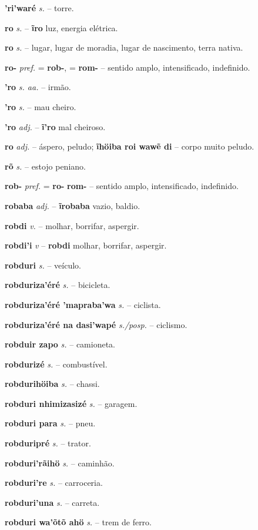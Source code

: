 \textbf{'ri'waré} \textit{s.} -- torre.

\textbf{ro} \textit{s.} -- \textbf{ĩro} luz, energia elétrica.

\textbf{ro} \textit{s.} -- lugar, lugar de moradia, lugar de nascimento, terra nativa.

\textbf{ro-} \textit{pref.} = \textbf{rob-}, = \textbf{rom-} -- sentido amplo, intensificado, indefinido.

\textbf{'ro} \textit{s. aa.} -- irmão.

\textbf{'ro} \textit{s.} -- mau cheiro.

\textbf{'ro} \textit{adj.} -- \textbf{ĩ'ro} mal cheiroso.

\textbf{ro} \textit{adj.} -- áspero, peludo; \textbf{ĩhöiba roi wawẽ di} -- corpo muito peludo.

\textbf{rõ} \textit{s.} -- estojo peniano.

\textbf{rob-} \textit{pref.} = \textbf{ro-} \textbf{rom-} -- sentido amplo, intensificado, indefinido.

\textbf{robaba} \textit{adj.} -- \textbf{ĩrobaba} vazio, baldio.

\textbf{robdi} \textit{v.} -- molhar, borrifar, aspergir.

\textbf{robdi'i} \textit{v} -- \textbf{robdi} molhar, borrifar, aspergir.

\textbf{robduri} \textit{s.} -- veículo.

\textbf{robduriza'éré} \textit{s.} -- bicicleta.

\textbf{robduriza'éré 'mapraba'wa} \textit{s.} -- ciclista.

\textbf{robduriza'éré na dasi'wapé} \textit{s./posp.} -- ciclismo.

\textbf{robduir zapo} \textit{s.} -- camioneta.

\textbf{robdurizé} \textit{s.} -- combustível.

\textbf{robdurihöiba} \textit{s.} -- chassi.

\textbf{robduri nhimizasizé} \textit{s.} -- garagem.

\textbf{robduri para} \textit{s.} -- pneu.

\textbf{robduripré} \textit{s.} -- trator.

\textbf{robduri'rãihö} \textit{s.} -- caminhão.

\textbf{robduri're} \textit{s.} -- carroceria.

\textbf{robduri'una} \textit{s.} -- carreta.

\textbf{robduri wa'õtõ ahö} \textit{s.} -- trem de ferro.

